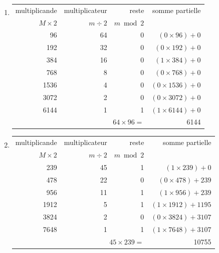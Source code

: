 \begin{description}
	\noindent
	\begin{minipage}[t]{12cm}
	\begin{enumerate}
	\item \begin{tabular}[t]{|r|r|r|r|}
		\hline
		multiplicande & multiplicateur & reste      & somme partielle\\
		$M \times 2$  & $m \div 2$     & $m \bmod 2$ &       \\
		\hline
		 96  & 64 &   0   &   $(0\times 96) + 0$ \\
		192  & 32 &   0   &   $(0\times 192) + 0$ \\
		384  & 16 &   0   &   $(1\times 384) + 0$ \\
		768  &  8 &   0   &   $(0\times 768) + 0$  \\
	       1536  &  4 &   0   &   $(0\times 1536) + 0$ \\
	       3072  &  2 &   0   &   $(0\times 3072) + 0$ \\
	       6144  &  1 &   1   &   $(1\times 6144) + 0$ \\
		\hline
		\multicolumn{3}{|r|}{$64 \times 96 =$} & 6144\\
		\hline
		\end{tabular}
	\end{enumerate}
	\end{minipage}
	\hfill
	\begin{minipage}[t]{12cm}
	\begin{enumerate}\setcounter{enumi}{1}
	\item \begin{tabular}[t]{|r|r|r|r|}
		\hline
		multiplicande & multiplicateur & reste      & somme partielle\\
		$M \times 2$  & $m \div 2$     & $m \bmod 2$ &       \\
		\hline
		239  & 45 &   1   &   $(1\times 239) + 0$ \\
		478  & 22 &   0   &   $(0\times 478) + 239$ \\
		956  & 11 &   1   &   $(1\times 956) + 239$ \\
	       1912  &  5 &   1   &   $(1\times 1912) + 1195$  \\
	       3824  &  2 &   0   &   $(0\times 3824) + 3107$ \\
	       7648  &  1 &   1   &   $(1\times 7648) + 3107$ \\
		\hline
		\multicolumn{3}{|r|}{$45 \times 239 =$} & 10755\\
		\hline
		\end{tabular}
	\end{enumerate}
	\end{minipage}
	\vspace*{2mm}
	

\end{description}
